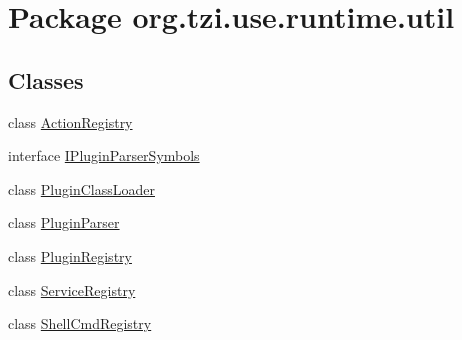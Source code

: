 \hypertarget{namespaceorg_1_1tzi_1_1use_1_1runtime_1_1util}{\section{Package org.\-tzi.\-use.\-runtime.\-util}
\label{namespaceorg_1_1tzi_1_1use_1_1runtime_1_1util}
}
\subsection*{Classes}
\begin{DoxyCompactItemize}
\item 
class \hyperlink{classorg_1_1tzi_1_1use_1_1runtime_1_1util_1_1_action_registry}{Action\-Registry}
\item 
interface \hyperlink{interfaceorg_1_1tzi_1_1use_1_1runtime_1_1util_1_1_i_plugin_parser_symbols}{I\-Plugin\-Parser\-Symbols}
\item 
class \hyperlink{classorg_1_1tzi_1_1use_1_1runtime_1_1util_1_1_plugin_class_loader}{Plugin\-Class\-Loader}
\item 
class \hyperlink{classorg_1_1tzi_1_1use_1_1runtime_1_1util_1_1_plugin_parser}{Plugin\-Parser}
\item 
class \hyperlink{classorg_1_1tzi_1_1use_1_1runtime_1_1util_1_1_plugin_registry}{Plugin\-Registry}
\item 
class \hyperlink{classorg_1_1tzi_1_1use_1_1runtime_1_1util_1_1_service_registry}{Service\-Registry}
\item 
class \hyperlink{classorg_1_1tzi_1_1use_1_1runtime_1_1util_1_1_shell_cmd_registry}{Shell\-Cmd\-Registry}
\end{DoxyCompactItemize}
